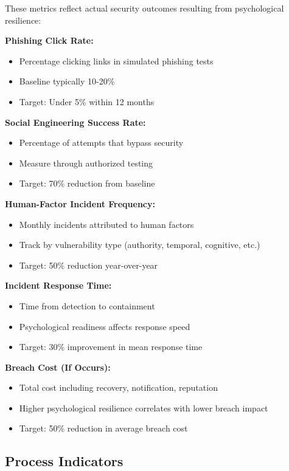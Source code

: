 \documentclass[11pt,a4paper]{article}
\begin{document}
These metrics reflect actual security outcomes resulting from psychological resilience:

\textbf{Phishing Click Rate:}
\begin{itemize}
\item Percentage clicking links in simulated phishing tests
\item Baseline typically 10-20\%
\item Target: Under 5\% within 12 months
\end{itemize}

\textbf{Social Engineering Success Rate:}
\begin{itemize}
\item Percentage of attempts that bypass security
\item Measure through authorized testing
\item Target: 70\% reduction from baseline
\end{itemize}

\textbf{Human-Factor Incident Frequency:}
\begin{itemize}
\item Monthly incidents attributed to human factors
\item Track by vulnerability type (authority, temporal, cognitive, etc.)
\item Target: 50\% reduction year-over-year
\end{itemize}

\textbf{Incident Response Time:}
\begin{itemize}
\item Time from detection to containment
\item Psychological readiness affects response speed
\item Target: 30\% improvement in mean response time
\end{itemize}

\textbf{Breach Cost (If Occurs):}
\begin{itemize}
\item Total cost including recovery, notification, reputation
\item Higher psychological resilience correlates with lower breach impact
\item Target: 50\% reduction in average breach cost
\end{itemize}

\subsection{Process Indicators}
\end{document}
